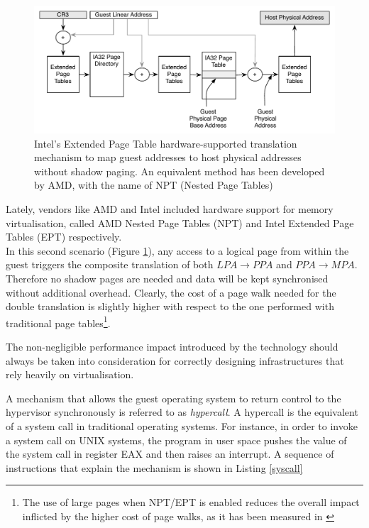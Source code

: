 \begin{figure}[htbp] 
\begin{center}
\includegraphics[scale=0.6]{images/EPT.pdf}
\caption{{Intel's Extended Page Table hardware-supported translation mechanism to map guest addresses to host physical addresses without shadow paging. An equivalent method has been developed by AMD, with the name of NPT (Nested Page Tables)}}
\label{EPT}
\end{center}
\end{figure}


Lately, vendors like AMD and Intel included hardware support for memory virtualisation, called AMD Nested Page Tables (NPT) and Intel Extended Page Tables (EPT)  respectively.\\ %
In this second scenario (Figure \ref{EPT}), any access to a logical page from within the guest triggers the composite translation of both $LPA \rightarrow PPA$ and $PPA \rightarrow MPA$. Therefore no shadow pages are needed and data will be kept synchronised without additional overhead. Clearly, the cost of a page walk needed for the double translation is slightly higher with respect to the one performed with traditional page tables\footnote{The use of large pages when NPT/EPT is enabled reduces the overall impact inflicted by the higher cost of page walks, as it has been measured in \cite{perfEPT, perfESX} }.  


The non-negligible performance impact introduced by the technology should always be taken into consideration for correctly designing infrastructures that rely heavily on virtualisation.%

A mechanism that allows the guest operating system to return control to the hypervisor synchronously is referred to as \emph{hypercall}. A hypercall is the equivalent of a system call in traditional operating systems. 
For instance, in order to invoke a system call on UNIX systems, the program in user space pushes the value of the system call in register EAX and then raises an interrupt. A sequence of instructions that explain the mechanism is shown in Listing \ref{syscall}

